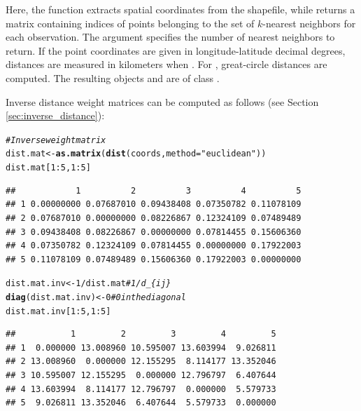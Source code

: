 \documentclass[english,12pt]{book}\usepackage[]{graphicx}\usepackage[]{xcolor}
\makeatletter
\newcommand{\hlnum}[1]{\textcolor[rgb]{0.686,0.059,0.569}{#1}}%
\newcommand{\hlstr}[1]{\textcolor[rgb]{0.192,0.494,0.8}{#1}}%
\newcommand{\hlcom}[1]{\textcolor[rgb]{0.678,0.584,0.686}{\textit{#1}}}%
\newcommand{\hlopt}[1]{\textcolor[rgb]{0,0,0}{#1}}%
\newcommand{\hlstd}[1]{\textcolor[rgb]{0.345,0.345,0.345}{#1}}%
\newcommand{\hlkwb}[1]{\textcolor[rgb]{0.69,0.353,0.396}{#1}}%
\newcommand{\hlkwc}[1]{\textcolor[rgb]{0.333,0.667,0.333}{#1}}%
\newcommand{\hlkwd}[1]{\textcolor[rgb]{0.737,0.353,0.396}{\textbf{#1}}}%
\newenvironment{kframe}{%
 \def\at@end@of@kframe{}%
 \ifinner\ifhmode%
  \def\at@end@of@kframe{\end{minipage}}%
  \begin{minipage}{\columnwidth}%
 \fi\fi%
 \def\FrameCommand##1{\hskip\@totalleftmargin \hskip-\fboxsep
 \colorbox{shadecolor}{##1}\hskip-\fboxsep
     \hskip-\linewidth \hskip-\@totalleftmargin \hskip\columnwidth}%
 \MakeFramed {\advance\hsize-\width
   \@totalleftmargin\z@ \linewidth\hsize
   \@setminipage}}%
 {\par\unskip\endMakeFramed%
 \at@end@of@kframe}
\newenvironment{knitrout}{}{} %
\makeatother
\begin{document}
Here, the  function extracts spatial coordinates from the shapefile, while  returns a matrix containing indices of points belonging to the set of $k$-nearest neighbors for each observation. The  argument specifies the number of nearest neighbors to return. If the point coordinates are given in longitude-latitude decimal degrees, distances are measured in kilometers when . For , great-circle distances are computed. The resulting objects  and  are of class .

Inverse distance weight matrices can be computed as follows (see Section \ref{sec:inverse_distance}):

\begin{knitrout}
\color{fgcolor}\begin{kframe}
\begin{alltt}
\hlcom{# Inverse weight matrix}
\hlstd{dist.mat} \hlkwb{<-} \hlkwd{as.matrix}\hlstd{(}\hlkwd{dist}\hlstd{(coords,} \hlkwc{method} \hlstd{=} \hlstr{"euclidean"}\hlstd{))}
\hlstd{dist.mat[}\hlnum{1}\hlopt{:}\hlnum{5}\hlstd{,} \hlnum{1}\hlopt{:}\hlnum{5}\hlstd{]}
\end{alltt}
\begin{verbatim}
##            1          2          3          4          5
## 1 0.00000000 0.07687010 0.09438408 0.07350782 0.11078109
## 2 0.07687010 0.00000000 0.08226867 0.12324109 0.07489489
## 3 0.09438408 0.08226867 0.00000000 0.07814455 0.15606360
## 4 0.07350782 0.12324109 0.07814455 0.00000000 0.17922003
## 5 0.11078109 0.07489489 0.15606360 0.17922003 0.00000000
\end{verbatim}
\begin{alltt}
\hlstd{dist.mat.inv} \hlkwb{<-} \hlnum{1} \hlopt{/} \hlstd{dist.mat} \hlcom{# 1 / d_\{ij\}}
\hlkwd{diag}\hlstd{(dist.mat.inv)} \hlkwb{<-} \hlnum{0}      \hlcom{# 0 in the diagonal}
\hlstd{dist.mat.inv[}\hlnum{1}\hlopt{:}\hlnum{5}\hlstd{,} \hlnum{1}\hlopt{:}\hlnum{5}\hlstd{]}
\end{alltt}
\begin{verbatim}
##           1         2         3         4         5
## 1  0.000000 13.008960 10.595007 13.603994  9.026811
## 2 13.008960  0.000000 12.155295  8.114177 13.352046
## 3 10.595007 12.155295  0.000000 12.796797  6.407644
## 4 13.603994  8.114177 12.796797  0.000000  5.579733
## 5  9.026811 13.352046  6.407644  5.579733  0.000000
\end{verbatim}

\end{kframe}
\end{knitrout}
\end{document}
